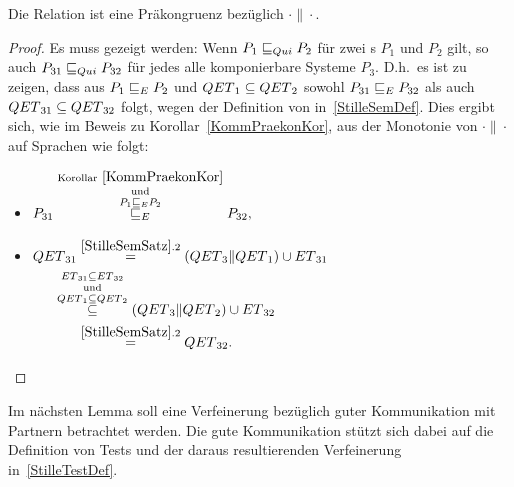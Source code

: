 \begin{Kor}
  \label{StillePraekonKor}
  Die Relation \QRel{} ist eine Präkongruenz bezüglich $\cdot\|\cdot$.
\end{Kor}
\begin{proof}
  Es muss gezeigt werden: Wenn $P_1 \sqsubseteq  _{Qui} P_2$ für zwei \MEIO{}s $P_1$ und $P_2$
  gilt, so auch $P_{31} \sqsubseteq  _{Qui} P_{32}$ für jedes alle komponierbare Systeme
  $P_3$. D.h.\ es ist zu zeigen, dass aus $P_1 \sqsubseteq  _E P_2$ und $QET{}_1\subseteq
  QET{}_2$ sowohl $P_{31} \sqsubseteq  _E P_{32}$ als auch $QET{}_{31}\subseteq
  QET{}_{32}$ folgt, wegen der Definition von \QRel{} in~\ref{StilleSemDef}.
  Dies ergibt sich, wie im Beweis zu Korollar~\ref{KommPraekonKor}, aus der
  Monotonie von $\cdot\|\cdot$ auf Sprachen wie folgt:
  \begin{itemize}
    \item $\begin{aligned}[t]
        P_{31} \overset{\mathrm{Korollar}~\ref{KommPraekonKor}}{
          \overset{\mathrm{und}}{\overset{P_1 \sqsubseteq  _E P_2}{ \sqsubseteq  _E}}}
        P_{32},
    \end{aligned}$
    \item $\begin{aligned}[t]
        \QET{}_{31} &\overset{\ref{StilleSemSatz}.2}{=}
        (\QET{}_3\|\QET{}_1)\cup \ET{}_{31}\\
        &\hspace{-0.6cm}\overset{\ET{}_{31}\subseteq
      \ET{}_{32}}{\overset{\mathrm{und}}{\overset{\QET{}_1\subseteq
      \QET{}_2}{\subseteq}}} (\QET{}_3\|\QET{}_2) \cup \ET{}_{32}\\
        &\overset{\ref{StilleSemSatz}.2}{=} \QET{}_{32}.
    \end{aligned}$
  \vspace*{-0.7cm}
  \end{itemize}
\end{proof}

Im nächsten Lemma soll eine Verfeinerung bezüglich guter Kommunikation mit
Partnern betrachtet werden. Die gute Kommunikation stützt sich dabei auf die
Definition von Tests und der daraus resultierenden Verfeinerung
in~\ref{StilleTestDef}.

